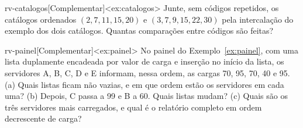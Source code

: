 \begin{exercicio}{rv-catalogos}[Complementar]<ex:catalogos>
Junte, sem códigos repetidos, os catálogos ordenados $(2,7,11,15,20)$ e $(3,7,9,15,22,30)$ pela intercalação do exemplo dos dois catálogos. Quantas comparações entre códigos são feitas?
\end{exercicio}
\begin{exercicio}{rv-painel}[Complementar]<ex:painel>
No painel do Exemplo~\ref{ex:painel}, com uma lista duplamente encadeada por valor de carga e inserção no início da lista, os servidores A, B, C, D e E informam, nessa ordem, as cargas 70, 95, 70, 40 e 95. (a) Quais listas ficam não vazias, e em que ordem estão os servidores em cada uma? (b) Depois, C passa a 99 e B a 60. Quais listas mudam? (c) Quais são os três servidores mais carregados, e qual é o relatório completo em ordem decrescente de carga?
\end{exercicio}
